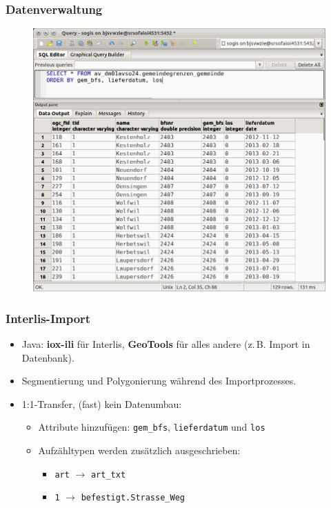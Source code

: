 \documentclass{beamer}
\begin{document}
\begin{frame}
  \frametitle{Datenverwaltung}
  \begin{figure}
    \includegraphics[scale=0.25]{bilder/veriso_liste_gemeinden_2.png}
  \end{figure}
\end{frame}

\begin{frame}
  \frametitle{Interlis-Import}
  \begin{itemize}
  \item Java: \textbf{iox-ili} für Interlis, \textbf{GeoTools} für alles andere (z.\,B. Import in Datenbank).
  \item Segmentierung und Polygonierung während des Importprozesses.
  \item 1:1-Transfer, (fast) kein Datenumbau:
  \begin{itemize}
   \item Attribute hinzufügen: \texttt{gem\_bfs}, \texttt{lieferdatum} und \texttt{los}
   \item Aufzähltypen werden zusätzlich ausgeschrieben:
   \begin{itemize}
    \item \texttt{art} $\rightarrow$ \texttt{art\_txt}
    \item \texttt{1} $\rightarrow$ \texttt{befestigt.Strasse\_Weg}
   \end{itemize}
  \end{itemize}
 \end{itemize}
\end{frame}
\end{document}
